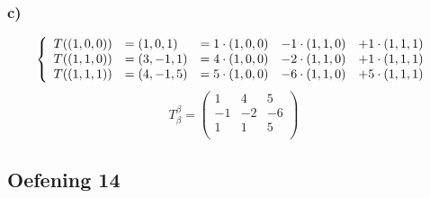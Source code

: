 \documentclass[lineaire_algebra_oplossingen.tex]{subfiles}
\begin{document}
\subsubsection*{c)}
\[
\left\lbrace
\begin{array}{c l c c c}
T((1,0,0)) &= (1,0,1) &= 1\cdot (1,0,0) &- 1\cdot (1,1,0) &+ 1\cdot (1,1,1)\\
T((1,1,0)) &= (3,-1,1)&= 4\cdot (1,0,0) &- 2\cdot (1,1,0) &+ 1\cdot (1,1,1)\\
T((1,1,1)) &= (4,-1,5)&= 5\cdot (1,0,0) &- 6\cdot (1,1,0) &+ 5\cdot (1,1,1)\\
\end{array}
\right.
\]
\[
T_\beta^\beta = 
\begin{pmatrix}
1 & 4 & 5\\
-1 & -2 & -6\\
1 & 1 & 5\\
\end{pmatrix}
\]

\subsection{Oefening 14}
\end{document}
